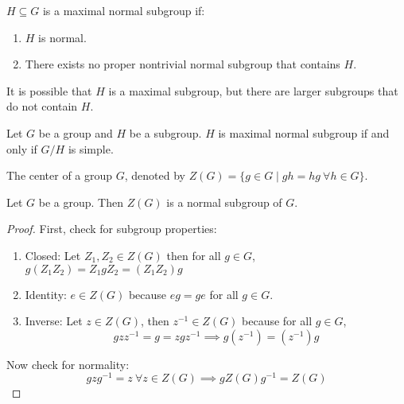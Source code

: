 \begin{definition}
    $H \subseteq G$ is a maximal normal subgroup if:
    \begin{enumerate}
        \item $H$ is normal.
        \item There exists no proper nontrivial normal subgroup that contains $H$.
    \end{enumerate}
\end{definition}

\begin{remark}
It is possible that $H$ is a maximal subgroup, but there are larger subgroups that do not contain $H$.
\end{remark}

\begin{theorem}
    Let $G$ be a group and $H$ be a subgroup. $H$ is maximal normal subgroup if and only if $G/H$ is simple.
\end{theorem}

\begin{definition}
    The center of a group $G$, denoted by $Z(G) = \{g \in G \mid gh = hg \ \forall h \in G\}$.
\end{definition}

\begin{theorem}
Let $G$ be a group. Then $Z(G)$ is a normal subgroup of $G$.
\end{theorem}
\begin{proof}
    First, check for subgroup properties:
    \begin{enumerate}
        \item Closed: Let $Z_1, Z_2 \in Z(G)$ then for all $g \in G$, $g(Z_1Z_2) = Z_1gZ_2 = (Z_1Z_2)g$
        \item Identity: $e \in Z(G)$ because $eg = ge$ for all $g \in G$.
        \item Inverse: Let $z \in Z(G)$, then $z^{-1} \in Z(G)$ because for all $g \in G$, \[gzz^{-1} = g = zgz^{-1} \implies g(z^{-1}) = (z^{-1})g\]
    \end{enumerate}
    Now check for normality:
    \[gzg^{-1} = z \ \forall z \in Z(G) \implies gZ(G)g^{-1} = Z(G)\]
\end{proof}
